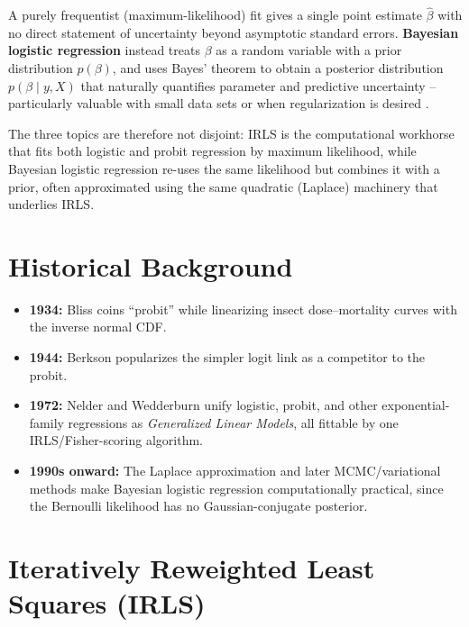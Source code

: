 \documentclass[a4paper,11pt]{article}
\begin{document}
A purely frequentist (maximum-likelihood) fit gives a single point estimate $\hat\beta$ with no direct statement of uncertainty beyond asymptotic standard errors. \textbf{Bayesian logistic regression} instead treats $\beta$ as a random variable with a prior distribution $p(\beta)$, and uses Bayes' theorem to obtain a posterior distribution $p(\beta \mid y, X)$ that naturally quantifies parameter and predictive uncertainty -- particularly valuable with small data sets or when regularization is desired \citep{bishop2006pattern}.

The three topics are therefore not disjoint: IRLS is the computational workhorse that fits both logistic and probit regression by maximum likelihood, while Bayesian logistic regression re-uses the same likelihood but combines it with a prior, often approximated using the same quadratic (Laplace) machinery that underlies IRLS.

\section{Historical Background}
\begin{itemize}[leftmargin=*, itemsep=0pt, topsep=2pt]
    \item \textbf{1934:} Bliss \citep{bliss1934method} coins ``probit'' while linearizing insect dose--mortality curves with the inverse normal CDF.
    \item \textbf{1944:} Berkson \citep{berkson1944application} popularizes the simpler logit link as a competitor to the probit.
    \item \textbf{1972:} Nelder and Wedderburn \citep{nelder1972glm} unify logistic, probit, and other exponential-family regressions as \emph{Generalized Linear Models}, all fittable by one IRLS/Fisher-scoring algorithm.
    \item \textbf{1990s onward:} The Laplace approximation \citep{spiegelhalter1990laplace} and later MCMC/variational methods make Bayesian logistic regression computationally practical, since the Bernoulli likelihood has no Gaussian-conjugate posterior.
\end{itemize}

\section{Iteratively Reweighted Least Squares (IRLS)}
\end{document}
